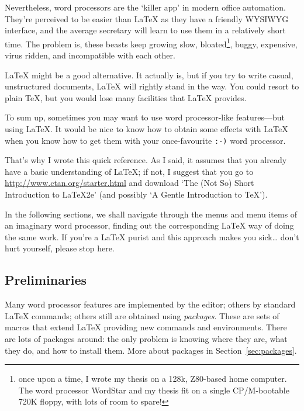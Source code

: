 \documentclass[11pt]{article}
\begin{document}
Nevertheless, word processors are the `killer app' in modern office
automation. They're perceived to be easier than \LaTeX{} as they have a
friendly WYSIWYG interface, and the average secretary will learn to use
them in a relatively short time. The problem is, these beasts keep growing
slow, bloated\footnote{once upon a time, I wrote my thesis on a 128k,
Z80-based home computer. The word processor WordStar and my thesis fit on
a single CP/M-bootable 720K floppy, with lots of room to spare!}, buggy,
expensive, virus ridden, and incompatible with each other.

\LaTeX{} might be a good alternative. It actually is, but if you try to
write casual, unstructured documents, \LaTeX{} will rightly stand in the
way. You could resort to plain \TeX{}, but you would lose many facilities
that \LaTeX{} provides.

To sum up, sometimes you may want to use word processor-like
features---but using \LaTeX. It would be nice to know how to obtain some
effects with \LaTeX{} when you know how to get them with your
once-favourite \texttt{:-)} word processor.

That's why I wrote this quick reference. As I said, it assumes that you
already have a basic understanding of \LaTeX{}; if not, I suggest that you
go to \url{http://www.ctan.org/starter.html} and download `The (Not So)
Short Introduction to \LaTeX2e{}' (and possibly `A Gentle Introduction to
\TeX{}').

In the following sections, we shall navigate through the menus and menu
items of an imaginary word processor, finding out the corresponding
\LaTeX{} way of doing the same work. If you're a \LaTeX{} purist and this
approach makes you sick{\ldots} don't hurt yourself, please stop here.



\subsection{Preliminaries}

Many word processor features are implemented by the editor; others by
standard \LaTeX{} commands; others still are obtained using
\emph{packages}. These are sets of macros that extend \LaTeX{} providing
new commands and environments. There are lots of packages around: the only
problem is knowing where they are, what they do, and how to install them.
More about packages in Section~\ref{sec:packages}.
\end{document}
